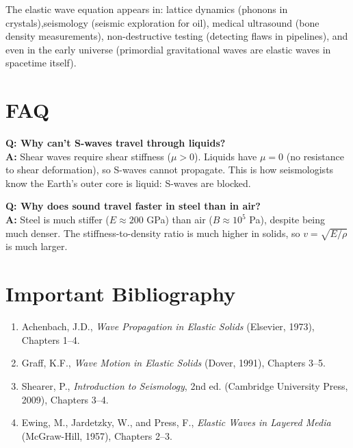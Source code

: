The elastic wave equation appears in: lattice dynamics (phonons in crystals),seismology (seismic exploration for oil), medical ultrasound (bone density measurements), non-destructive testing (detecting flaws in pipelines), and even in the early universe (primordial gravitational waves are elastic waves in spacetime itself).
\section*{FAQ}

\textbf{Q: Why can't S-waves travel through liquids?}\\
\textbf{A:} Shear waves require shear stiffness ($\mu > 0$). Liquids have $\mu = 0$ (no resistance to shear deformation), so S-waves cannot propagate. This is how seismologists know the Earth's outer core is liquid: S-waves are blocked.

\textbf{Q: Why does sound travel faster in steel than in air?}\\
\textbf{A:} Steel is much stiffer ($E \approx 200$ GPa) than air ($B \approx 10^5$ Pa), despite being much denser. The stiffness-to-density ratio is much higher in solids, so $v = \sqrt{E/\rho}$ is much larger.
\section*{Important Bibliography}

\begin{enumerate}
\item Achenbach, J.D., \textit{Wave Propagation in Elastic Solids} (Elsevier, 1973), Chapters 1--4.
\item Graff, K.F., \textit{Wave Motion in Elastic Solids} (Dover, 1991), Chapters 3--5.
\item Shearer, P., \textit{Introduction to Seismology}, 2nd ed. (Cambridge University Press, 2009), Chapters 3--4.
\item Ewing, M., Jardetzky, W., and Press, F., \textit{Elastic Waves in Layered Media} (McGraw-Hill, 1957), Chapters 2--3.
\end{enumerate}

